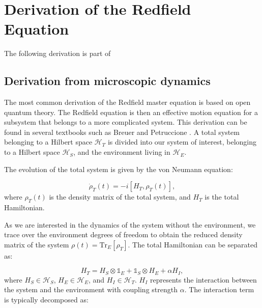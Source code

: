 
\chapter{Derivation of the Redfield Equation} %

\label{Chapter:Derivation_Redfield_Equation} %

The following derivation is part of \cite{manzanoShortIntroductionLindblad2020}

\section{Derivation from microscopic dynamics}
\label{sec:Derivation_redfield_eq_from_microscopic_dynamics}

The most common derivation of the Redfield master equation is based on open quantum theory.
The Redfield equation is then an effective motion equation for a subsystem that belongs to a more complicated system.
This derivation can be found in several textbooks such as Breuer and Petruccione \cite{breuerTheoryOpenQuantum2009}.
A total system belonging to a Hilbert space $\mathcal{H}_T$ is divided into our system of interest, belonging to a Hilbert space $\mathcal{H}_S$, and the environment living in $\mathcal{H}_E$.

The evolution of the total system is given by the von Neumann equation:

\begin{equation}
	\dot{\rho}_T(t) = -i[H_T, \rho_T(t)],
	\label{eq:Von_Neumann_Equation}
\end{equation}
where $\rho_T(t)$ is the density matrix of the total system, and $H_T$ is the total Hamiltonian.

As we are interested in the dynamics of the system without the environment, we trace over the environment degrees of freedom to obtain the reduced density matrix of the system $\rho(t) = \mathrm{Tr}_E[\rho_T]$. 
The total Hamiltonian can be separated as:

\begin{equation}
	H_T = H_S \otimes \mathbb{1}_E + \mathbb{1}_S \otimes H_E + \alpha H_I,
	\label{eq:Total_Hamiltonian}
\end{equation}
where $H_S \in \mathcal{H}_S$, $H_E \in \mathcal{H}_E$, and $H_I \in \mathcal{H}_T$. $ H_I $ represents the interaction between the system and the environment with coupling strength $\alpha$. 
The interaction term is typically decomposed as:

